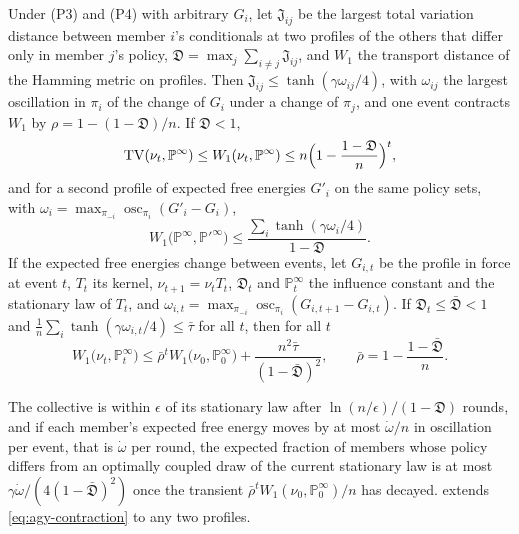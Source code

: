 \begin{proposition}\label{prop:obj-finite}
Under (P3) and (P4) with arbitrary $G_i$, let $\mathfrak J_{ij}$ be the largest total variation distance between member $i$'s conditionals at two profiles of the others that differ only in member $j$'s policy, $\mathfrak D=\max_j\sum_{i\ne j}\mathfrak J_{ij}$, and $W_1$ the transport distance of the Hamming metric on profiles. Then $\mathfrak J_{ij}\le\tanh(\gamma\omega_{ij}/4)$, with $\omega_{ij}$ the largest oscillation in $\pi_i$ of the change of $G_i$ under a change of $\pi_j$, and one event contracts $W_1$ by $\rho=1-(1-\mathfrak D)/n$. If $\mathfrak D<1$,
\begin{equation}\label{eq:obj-finite-mixing}
\mathrm{TV}(\nu_t,\mathbb P^\infty)\le W_1(\nu_t,\mathbb P^\infty)\le n\Bigl(1-\frac{1-\mathfrak D}n\Bigr)^t,
\end{equation}
and for a second profile of expected free energies $G'_i$ on the same policy sets, with $\omega_i=\max_{\pi_{-i}}\operatorname{osc}_{\pi_i}(G'_i-G_i)$,
\begin{equation}\label{eq:obj-finite-shift}
W_1\bigl(\mathbb P^\infty,\mathbb P'^\infty\bigr)\le\frac{\sum_i\tanh(\gamma\omega_i/4)}{1-\mathfrak D}.
\end{equation}
If the expected free energies change between events, let $G_{i,t}$ be the profile in force at event $t$, $T_t$ its kernel, $\nu_{t+1}=\nu_tT_t$, $\mathfrak D_t$ and $\mathbb P^\infty_t$ the influence constant and the stationary law of $T_t$, and $\omega_{i,t}=\max_{\pi_{-i}}\operatorname{osc}_{\pi_i}(G_{i,t+1}-G_{i,t})$. If $\mathfrak D_t\le\bar{\mathfrak D}<1$ and $\frac1n\sum_i\tanh(\gamma\omega_{i,t}/4)\le\bar\tau$ for all $t$, then for all $t$
\begin{equation}\label{eq:obj-finite-tracking}
W_1\bigl(\nu_t,\mathbb P^\infty_t\bigr)\le\bar\rho^tW_1\bigl(\nu_0,\mathbb P^\infty_0\bigr)+\frac{n^2\bar\tau}{(1-\bar{\mathfrak D})^2},\qquad\bar\rho=1-\frac{1-\bar{\mathfrak D}}n.
\end{equation}
\end{proposition}

The collective is within $\epsilon$ of its stationary law after $\ln(n/\epsilon)/(1-\mathfrak D)$ rounds, and if each member's expected free energy moves by at most $\dot\omega/n$ in oscillation per event, that is $\dot\omega$ per round, the expected fraction of members whose policy differs from an optimally coupled draw of the current stationary law is at most $\gamma\dot\omega/(4(1-\bar{\mathfrak D})^2)$ once the transient $\bar\rho^tW_1(\nu_0,\mathbb P^\infty_0)/n$ has decayed.  extends \eqref{eq:agy-contraction} to any two profiles.

